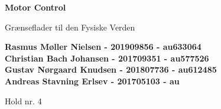 \documentclass{article}
\begin{document}
\begin{titlepage}
    
    \begin{center}
        \vspace*{1cm}
 
        \Huge
        \textbf{Motor Control}
 
        \vspace{0.5cm}
        \LARGE
        Grænseflader til den Fysiske Verden \\
        \date\today
 
        \vspace{1.5cm}
 
        \textbf{
        Rasmus Møller Nielsen - 201909856 - au633064 \\
	   Christian Bach Johansen - 201709351 - au577526\\
	   Gustav Nørgaard Knudsen - 201807736 - au612485\\
	   Andreas Stavning Erlsev - 201705103 - au}
        
        \vfill
        \vspace{2cm}
 
        Hold nr. 4
 
    \end{center}
\end{titlepage}

\newpage
\tableofcontents
\newpage

\setcounter{page}{1}

\end{document}
